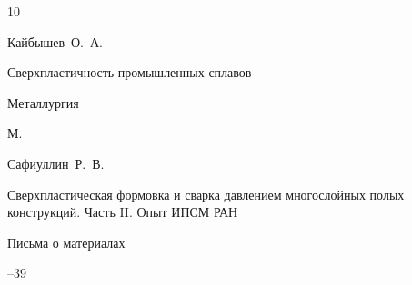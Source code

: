 \begin{thebibliography}{10}












\by Кайбышев~О.~А.

\book Сверхпластичность промышленных сплавов


\publ Металлургия

\publaddr М.

















\by Сафиуллин~Р.~В.

\paper Сверхпластическая формовка и сварка давлением многослойных полых конструкций. Часть II. Опыт ИПСМ РАН

\jour Письма о материалах




--39








\end{thebibliography}
